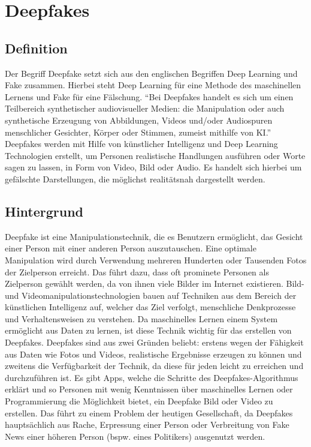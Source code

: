 \section{Deepfakes}
\subsection{Definition}
Der Begriff Deepfake setzt sich aus den englischen Begriffen Deep Learning und Fake zusammen. Hierbei steht Deep Learning für eine Methode des maschinellen Lernens und Fake für eine Fälschung.\newline
``Bei Deepfakes handelt es sich um einen Teilbereich synthetischer audiovisueller Medien: die Manipulation oder auch synthetische Erzeugung von Abbildungen, Videos und/oder Audiospuren menschlicher Gesichter, Körper oder Stimmen, zumeist mithilfe von KI.''\cite{SpringerLink}
\cite{SpringerLink}
\newline
Deepfakes werden mit Hilfe von künstlicher Intelligenz und Deep Learning Technologien erstellt, um Personen realistische Handlungen ausführen oder Worte sagen zu lassen, in Form von Video, Bild oder Audio. Es handelt sich hierbei um gefälschte Darstellungen, die möglichst realitätsnah dargestellt werden.\cite{ScienceDirect}

\subsection{Hintergrund}
Deepfake ist eine Manipulationstechnik, die es Benutzern ermöglicht, das Gesicht einer Person mit einer anderen Person auszutauschen. Eine optimale Manipulation wird durch Verwendung mehreren Hunderten oder Tausenden Fotos der Zielperson erreicht. Das führt dazu, dass oft prominete Personen als Zielperson gewählt werden, da von ihnen viele Bilder im Internet existieren.\newline
Bild- und Videomanipulationstechnologien bauen auf Techniken aus dem Bereich der künstlichen Intelligenz auf, welcher das Ziel verfolgt, menschliche Denkprozesse und Verhaltensweisen zu verstehen.
Da maschinelles Lernen einem System ermöglicht aus Daten zu lernen, ist diese Technik wichtig für das erstellen von Deepfakes. \newline
Deepfakes sind aus zwei Gründen beliebt: erstens wegen der Fähigkeit aus Daten wie Fotos und Videos, realistische Ergebnisse erzeugen zu können und zweitens die Verfügbarkeit der Technik, da diese für jeden leicht zu erreichen und durchzuführen ist.
Es gibt Apps, welche die Schritte des Deepfakes-Algorithmus erklärt und so Personen mit wenig Kenntnissen über maschinelles Lernen oder Programmierung die Möglichkeit bietet, ein Deepfake Bild oder Video zu erstellen. \newline
Das führt zu einem Problem der heutigen Gesellschaft, da Deepfakes hauptsächlich aus Rache, Erpressung einer Person oder Verbreitung von Fake News einer höheren Person (bspw. eines Politikers) ausgenutzt werden.\cite{Jatit}

